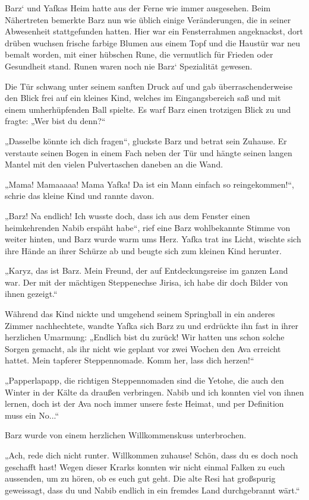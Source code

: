 Barz‘ und Yafkas Heim hatte aus der Ferne wie immer ausgesehen. Beim Nähertreten bemerkte Barz nun wie üblich einige Veränderungen, die in seiner Abwesenheit stattgefunden hatten. Hier war ein Fensterrahmen angeknackst, dort drüben wuchsen frische farbige Blumen aus einem Topf und die Haustür war neu bemalt worden, mit einer hübschen Rune, die vermutlich für Frieden oder Gesundheit stand. Runen waren noch nie Barz‘ Spezialität gewesen.

Die Tür schwang unter seinem sanften Druck auf und gab überraschenderweise den Blick frei auf ein kleines Kind, welches im Eingangsbereich saß und mit einem umherhüpfenden Ball spielte. Es warf Barz einen trotzigen Blick zu und fragte: „Wer bist du denn?“

„Dasselbe könnte ich dich fragen“, gluckste Barz und betrat sein Zuhause. Er verstaute seinen Bogen in einem Fach neben der Tür und hängte seinen langen Mantel mit den vielen Pulvertaschen daneben an die Wand.

„Mama! Mamaaaaa! Mama Yafka! Da ist ein Mann einfach so reingekommen!“, schrie das kleine Kind und rannte davon.

„Barz! Na endlich! Ich wusste doch, dass ich aus dem Fenster einen heimkehrenden Nabib erspäht habe“, rief eine Barz wohlbekannte Stimme von weiter hinten, und Barz wurde warm ums Herz. Yafka trat ins Licht, wischte sich ihre Hände an ihrer Schürze ab und beugte sich zum kleinen Kind herunter.

„Karyz, das ist Barz. Mein Freund, der auf Entdeckungsreise im ganzen Land war. Der mit der mächtigen Steppenechse Jirisa, ich habe dir doch Bilder von ihnen gezeigt.“

Während das Kind nickte und umgehend seinem Springball in ein anderes Zimmer nachhechtete, wandte Yafka sich Barz zu und erdrückte ihn fast in ihrer herzlichen Umarmung: „Endlich bist du zurück! Wir hatten uns schon solche Sorgen gemacht, als ihr nicht wie geplant vor zwei Wochen den Ava erreicht hattet. Mein tapferer Steppennomade. Komm her, lass dich herzen!“

„Papperlapapp, die richtigen Steppennomaden sind die Yetohe, die auch den Winter in der Kälte da draußen verbringen. Nabib und ich konnten viel von ihnen lernen, doch ist der Ava noch immer unsere feste Heimat, und per Definition muss ein No...“

Barz wurde von einem herzlichen Willkommenskuss unterbrochen.

„Ach, rede dich nicht runter. Willkommen zuhause! Schön, dass du es doch noch geschafft hast! Wegen dieser Krarks konnten wir nicht einmal Falken zu euch aussenden, um zu hören, ob es euch gut geht. Die alte Resi hat großspurig geweissagt, dass du und Nabib endlich in ein fremdes Land durchgebrannt wärt.“

